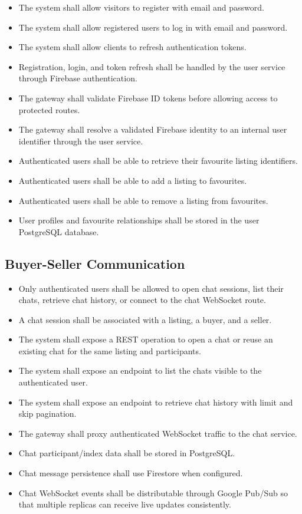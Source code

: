 \begin{itemize}
    \item The system shall allow visitors to register with email and password.
    \item The system shall allow registered users to log in with email and password.
    \item The system shall allow clients to refresh authentication tokens.
    \item Registration, login, and token refresh shall be handled by the user service through Firebase authentication.
    \item The gateway shall validate Firebase ID tokens before allowing access to protected routes.
    \item The gateway shall resolve a validated Firebase identity to an internal user identifier through the user service.
    \item Authenticated users shall be able to retrieve their favourite listing identifiers.
    \item Authenticated users shall be able to add a listing to favourites.
    \item Authenticated users shall be able to remove a listing from favourites.
    \item User profiles and favourite relationships shall be stored in the user PostgreSQL database.
\end{itemize}

\subsection{Buyer-Seller Communication}

\begin{itemize}
    \item Only authenticated users shall be allowed to open chat sessions, list their chats, retrieve chat history, or connect to the chat WebSocket route.
    \item A chat session shall be associated with a listing, a buyer, and a seller.
    \item The system shall expose a REST operation to open a chat or reuse an existing chat for the same listing and participants.
    \item The system shall expose an endpoint to list the chats visible to the authenticated user.
    \item The system shall expose an endpoint to retrieve chat history with limit and skip pagination.
    \item The gateway shall proxy authenticated WebSocket traffic to the chat service.
    \item Chat participant/index data shall be stored in PostgreSQL.
    \item Chat message persistence shall use Firestore when configured.
    \item Chat WebSocket events shall be distributable through Google Pub/Sub so that multiple replicas can receive live updates consistently.
\end{itemize}


